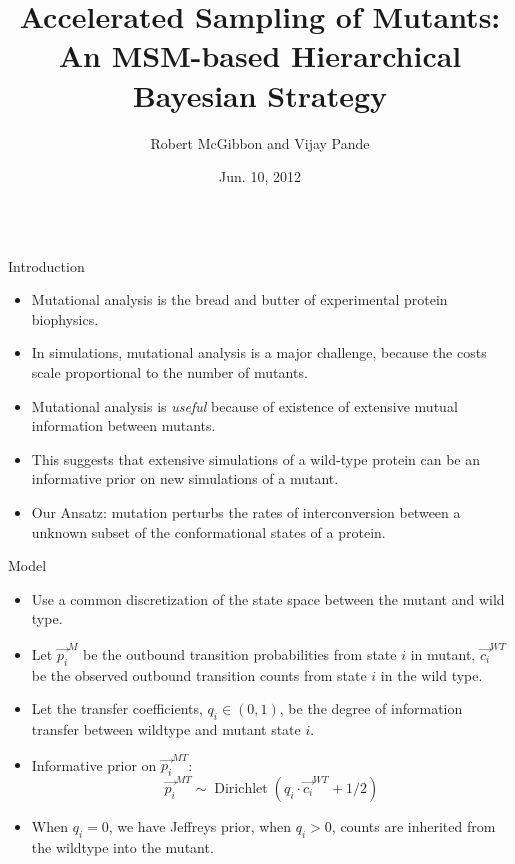 \documentclass[final]{beamer}
\title{Accelerated Sampling of Mutants: An MSM-based Hierarchical Bayesian Strategy}
\author{Robert McGibbon and Vijay Pande}
\institute[Stanford University]{Department of Chemistry, Stanford University, Stanford, CA.}
\date[Jun. 10, 2012]{Jun. 10, 2012}
\begin{document}
\begin{frame}{}%
  \vspace{-1.2in}
  \begin{columns}[t]


\begin{column}{.3\linewidth}

\begin{block}{Introduction}
  \begin{itemize}
  \item Mutational analysis is the bread and butter of experimental protein biophysics.
  \item In simulations, mutational analysis is a major challenge, because the costs scale proportional to the number of mutants.
  \item Mutational analysis is \emph{useful} because of existence of extensive
  mutual information between mutants.
  \item This suggests that extensive simulations of a wild-type protein can be an \alert{informative prior} on new simulations of a mutant.
  \item Our Ansatz: mutation perturbs the rates of interconversion between a unknown subset of the conformational states of a protein.
  \end{itemize}
\end{block}
\vspace{0.5in}

\begin{block}{Model}
\begin{itemize}
    \item Use a common discretization of the state space between the mutant and wild type.

    \item Let $\vec{p_i}^{M}$ be the outbound transition probabilities from state $i$ in mutant, $\vec{c_i}^{WT}$ be the observed outbound transition counts from state $i$ in the wild type.

    \item Let the transfer coefficients, $q_i \in (0, 1)$, be the degree of information transfer between wildtype and mutant state $i$.

    \item \alert{Informative prior} on $\vec{p_i}^{MT}$:
    $$ \vec{p_i}^{MT} \sim \operatorname{Dirichlet}(q_i \cdot \vec{c_i}^{WT} + 1/2) $$
    \item When $q_i=0$, we have Jeffreys prior, when $q_i > 0$, counts are \alert{inherited} from the wildtype into the mutant.
    

\end{itemize}
\end{block}
\end{column}
\end{columns}
\end{frame}
\end{document}

